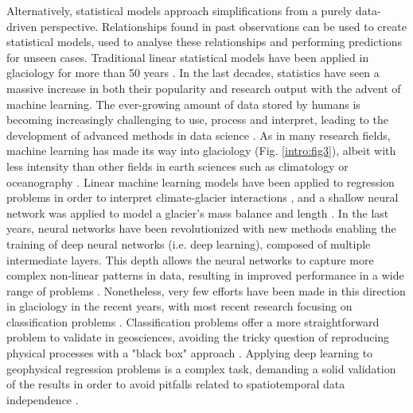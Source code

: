Alternatively, statistical models approach simplifications from a purely data-driven perspective. Relationships found in past observations can be used to create statistical models, used to analyse these relationships and performing predictions for unseen cases. Traditional linear statistical models have been applied in glaciology for more than 50 years \citep{hoinkes_glacier_1968, martin_correlation_1974}. In the last decades, statistics have seen a massive increase in both their popularity and research output with the advent of machine learning. The ever-growing amount of data stored by humans is becoming increasingly challenging to use, process and interpret, leading to the development of advanced methods in data science \citep{mjolsness_machine_2001}. As in many research fields, machine learning has made its way into glaciology (Fig.  \ref{intro:fig3}), albeit with less intensity than other fields in earth sciences such as climatology \citep[e.g.][]{liu_application_2016,ham_deep_2019,jiang_deep_2018} or oceanography \citep[e.g.][]{ducournau_deep_2016,lguensat_learning_2019}. Linear machine learning models have been applied to regression problems in order to interpret climate-glacier interactions \citep{maussion_enso_2015}, and a shallow neural network was applied to model a glacier's mass balance and length \citep{steiner_application_2005,steiner_sensitivity_2008}.  In the last years, neural networks have been revolutionized with new methods enabling the training of deep neural networks (i.e. deep learning), composed of multiple intermediate layers. This depth allows the neural networks to capture more complex non-linear patterns in data, resulting in improved performance in a wide range of problems \citep{wang_origin_2017}. Nonetheless, very few efforts have been made in this direction in glaciology in the recent years, with most recent research focusing on classification problems \citep{mohajerani_detection_2019, baumhoer_automated_2019, zhang_automatically_2019}. Classification problems offer a more straightforward problem to validate in geosciences, avoiding the tricky question of reproducing physical processes with a "black box" approach \citep{karpatne_theory-guided_2017}. Applying deep learning to geophysical regression problems is a complex task, demanding a solid validation of the results in order to avoid pitfalls related to spatiotemporal data independence \citep{roberts_cross-validation_2017}. 

